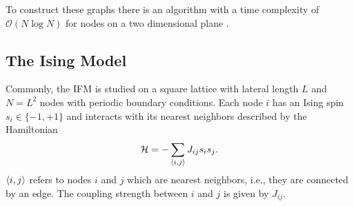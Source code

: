     To construct these graphs there is an algorithm with
    a time complexity of \(\mathcal{O}(N \log N)\) for nodes on a two
    dimensional plane \cite{RNGCell}.

\subsection{The Ising Model}
\label{ssec:model}
    Commonly, the IFM is studied on a square lattice with lateral length
    \(L\) and \(N=L^2\) nodes with periodic boundary conditions.
    Each node $i$ has an Ising spin \(s_i \in \{-1,+1\}\) and interacts with its
    nearest neighbors described by the Hamiltonian
    \begin{equation}
        \mathcal{H} = - \sum_{\left< i,j \right>}J_{ij}s_{i}s_{j}.
        \label{eq:hamiltonian}
    \end{equation}
    \(\left< i,j \right>\) refers to nodes \(i\) and \(j\) which are
    nearest neighbors, i.e., they are connected by an edge.
    The coupling strength between \(i\) and \(j\) is given by
    \(J_{ij}\).

